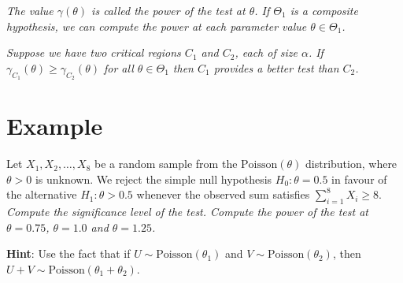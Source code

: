 \bit
\it The value $\gamma(\theta)$ is called the \emph{power of the test at $\theta$}.
\it If $\Theta_1$ is a composite hypothesis, we can compute the power at each parameter value $\theta\in\Theta_1$.
\eit

\vspace*{2ex}
\bit
\it Suppose we have two critical regions $C_1$ and $C_2$, each of size $\alpha$. 
\it If $\gamma_{C_1}(\theta) \geq \gamma_{C_2}(\theta)$ for all $\theta\in\Theta_1$ then $C_1$ provides a better test than $C_2$.
\eit



\section{Example}
\begin{example}
Let $X_1,X_2,\ldots,X_8$ be a random sample from the $\text{Poisson}(\theta)$ distribution, where $\theta>0$ is unknown. We reject the simple null hypothesis $H_0:\theta=0.5$ in favour of the alternative $H_1:\theta>0.5$ whenever the observed sum satisfies $\sum_{i=1}^8 X_i \geq 8$.
\ben
\it Compute the significance level of the test.
\it Compute the power of the test at $\theta = 0.75$, $\theta = 1.0$ and $\theta = 1.25$.
\een
\end{example}

\textbf{Hint}: Use the fact that if $U\sim\text{Poisson}(\theta_1)$ and $V\sim\text{Poisson}(\theta_2)$, then $U+V\sim\text{Poisson}(\theta_1+\theta_2)$.

